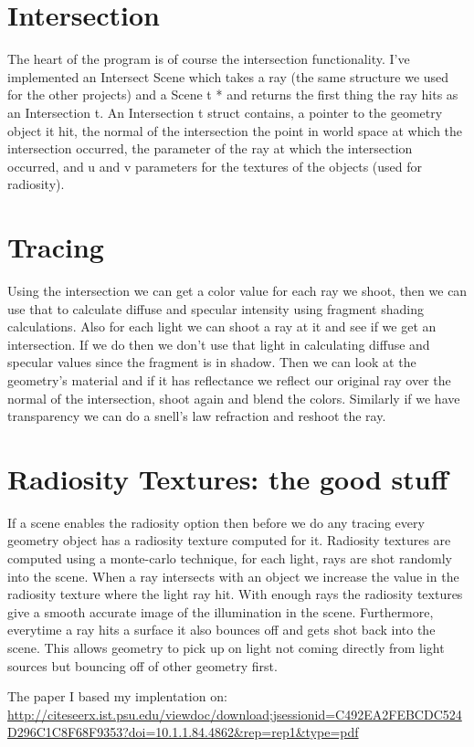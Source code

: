 \documentclass{article}
\begin{document}
\section{Intersection}
The heart of the program is of course the intersection functionality. I've implemented an Intersect Scene which takes a ray (the same structure we used for the other projects) and a Scene t * and returns the first thing the ray hits as an Intersection t. An Intersection t struct contains, a pointer to the geometry object it hit, the normal of the intersection the point in world space at which the intersection occurred, the parameter of the ray at which the intersection occurred, and u and v parameters for the textures of the objects (used for radiosity).

\section{Tracing}
Using the intersection we can get a color value for each ray we shoot, then we can use that to calculate diffuse and specular intensity using fragment shading calculations. Also for each light we can shoot a ray at it and see if we get an intersection. If we do then we don't use that light in calculating diffuse and specular values since the fragment is in shadow. Then we can look at the geometry's material and if it has reflectance we reflect our original ray over the normal of the intersection, shoot again and blend the colors. Similarly if we have transparency we can do a snell's law refraction and reshoot the ray.

\section{Radiosity Textures: the good stuff}
If a scene enables the radiosity option then before we do any tracing every geometry object has a radiosity texture computed for it. Radiosity textures are computed using a monte-carlo technique, for each light, rays are shot randomly into the scene. When a ray intersects with an object we increase the value in the radiosity texture where the light ray hit. With enough rays the radiosity textures give a smooth accurate image of the illumination in the scene. Furthermore, everytime a ray hits a surface it also bounces off and gets shot back into the scene. This allows geometry to pick up on light not coming directly from light sources but bouncing off of other geometry first.

The paper I based my implentation on: \url{http://citeseerx.ist.psu.edu/viewdoc/download;jsessionid=C492EA2FEBCDC524D296C1C8F68F9353?doi=10.1.1.84.4862&rep=rep1&type=pdf} 
\end{document}
